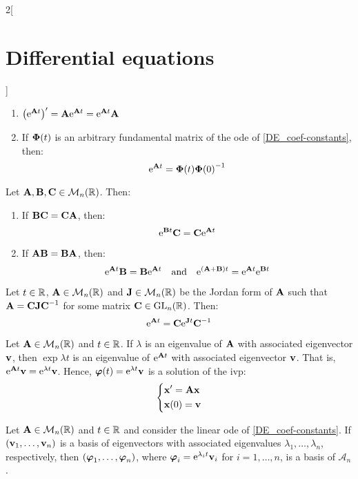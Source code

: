\documentclass[../../../main.tex]{subfiles}
\begin{document}
\begin{multicols}{2}[\section{Differential equations}]
\begin{prop}
\begin{enumerate}
            \item $\left(\exp{\vf{A}t}\right)'=\vf{A}\exp{\vf{A}t}=\exp{\vf{A}t}\vf{A}$
            \item If $\vf{\Phi}(t)$ is an arbitrary fundamental matrix of the ode of \cref{DE_coef-constants}, then: $$\exp{\vf{A}t}=\vf{\Phi}(t){\vf{\Phi}(0)}^{-1}$$
        \end{enumerate}
    \end{prop}
    \begin{lemma}
        Let $\vf{A},\vf{B},\vf{C}\in\mathcal{M}_n(\RR)$. Then:
        \begin{enumerate}
            \item If $\vf{B}\vf{C}=\vf{C}\vf{A}$, then: $$\exp{\vf{B}t}\vf{C}=\vf{C}\exp{\vf{A}t}$$
            \item If $\vf{A}\vf{B}=\vf{B}\vf{A}$, then: $$\exp{\vf{A}t}\vf{B}=\vf{B}\exp{\vf{A}t}\quad\text{and}\quad\exp{(\vf{A}+\vf{B})t}=\exp{\vf{A}t}\exp{\vf{B}t}$$
        \end{enumerate}
    \end{lemma}
    \begin{corollary}
        Let $t\in\RR$, $\vf{A}\in\mathcal{M}_n(\RR)$ and $\vf{J}\in\mathcal{M}_n(\RR)$ be the Jordan form of $\vf{A}$ such that $\vf{A}=\vf{C}\vf{J}\vf{C}^{-1}$ for some matrix $\vf{C}\in\GL_n(\RR)$. Then: $$\exp{\vf{A}t}=\vf{C}\exp{\vf{J}t}\vf{C}^{-1}$$
    \end{corollary}
    \begin{prop}
        Let $\vf{A}\in\mathcal{M}_n(\RR)$ and $t\in\RR$. If $\lambda$ is an eigenvalue of $\vf{A}$ with associated eigenvector $\vf{v}$, then $\exp{\lambda t}$ is an eigenvalue of $\exp{\vf{A}t}$ with associated eigenvector $\vf{v}$. That is, $\exp{\vf{A}t}\vf{v}=\exp{\lambda t}\vf{v}$. Hence, $\vf{\varphi}(t)=\exp{\lambda t}\vf{v}$ is a solution of the ivp:
        $$
            \left\{
            \begin{aligned}
                 & \vf{x}'      =\vf{A}\vf{x} \\
                 & \vf{x}(0)  =\vf{v}
            \end{aligned}
            \right.
        $$
    \end{prop}
    \begin{corollary}
        Let $\vf{A}\in\mathcal{M}_n(\RR)$ and $t\in\RR$ and consider the linear ode of \cref{DE_coef-constants}. If $(\vf{v}_1,\ldots,\vf{v}_n)$ is a basis of eigenvectors with associated eigenvalues $\lambda_1,\ldots,\lambda_n$, respectively, then $(\vf{\varphi}_1,\ldots,\vf{\varphi}_n)$, where $\vf{\varphi}_i=\exp{\lambda_it}\vf{v}_i$ for $i=1,\ldots,n$, is a basis of $\mathcal{A}_n$.

\end{corollary}
\end{multicols}
\end{document}

